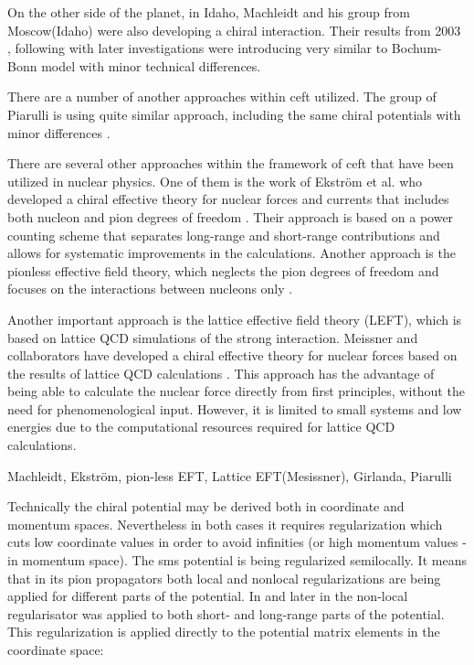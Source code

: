 On the other side of the planet, in Idaho, Machleidt and his group from Moscow(Idaho) were also developing 
a chiral interaction. Their results from 2003 \cite{Entem2003}, following with later investigations \cite{Machleidt2005, Machleidt2010, Entem2017} were introducing very similar to Bochum-Bonn
model with minor technical differences.

There are a number of another approaches within \gls{ceft} utilized.
The group of Piarulli is using quite similar approach, including
the same chiral potentials with minor differences \cite{Piarulli2012,Piarulli2015}.

There are several other approaches within the framework of \gls{ceft}
that have been utilized in nuclear physics.
One of them is the work of Ekström et al. who developed a chiral
effective theory for nuclear forces and currents that includes both
nucleon and pion degrees of freedom \cite{?}. Their approach
is based on a power counting scheme that separates long-range and
short-range contributions and allows for systematic improvements in the
calculations. Another approach is the pionless effective field
theory, which neglects the pion degrees of freedom and
focuses on the interactions between nucleons only \cite{?}.

Another important approach is the lattice effective field theory (LEFT), which
is based on lattice QCD simulations of the strong
interaction. Meissner and collaborators have developed a chiral effective
theory for nuclear forces based on the results of lattice QCD
calculations \cite{?}. This approach has the advantage of being able
to calculate the nuclear force directly from first
principles, without the need for phenomenological input. However, it is limited
to small systems and low energies due to the computational
resources required for lattice QCD calculations.


{\color{red} Machleidt, Ekstr\"om, pion-less EFT, Lattice EFT(Mesissner), Girlanda, Piarulli}


Technically the chiral potential may be derived both in coordinate and momentum spaces.
Nevertheless in both cases it requires regularization which cuts 
low coordinate values in order to avoid infinities 
(or high momentum values - in momentum space). 
The \gls{sms} potential is being regularized semilocally. 
It means that  in its pion propagators both local and nonlocal regularizations
are being applied for different parts of the potential.
In \cite{Entem2003, epelbaum2005two} and later in \cite{Entem2017, Epelbaum2014SCS} the non-local regularisator was applied to both short- and long-range parts of the potential. 
This regularization is applied directly to the potential matrix elements 
in the coordinate space:

